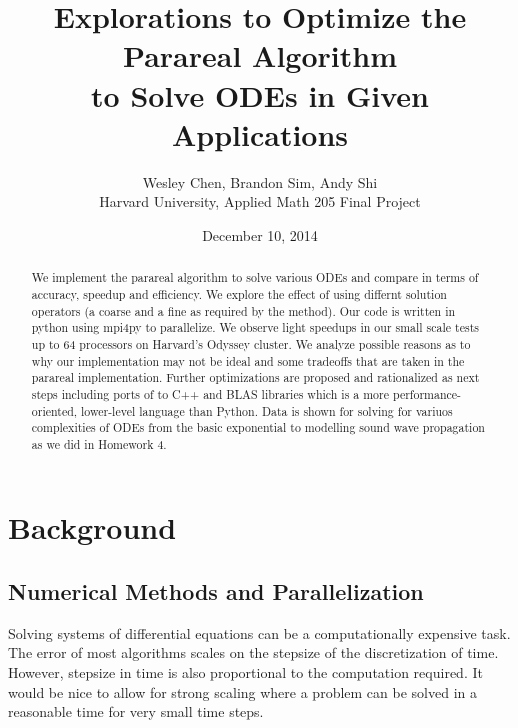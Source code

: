 \documentclass[letterpaper,12pt]{article}
\begin{document}
\title{Explorations to Optimize the Parareal Algorithm \\to Solve ODEs in Given Applications}
\author{Wesley Chen, Brandon Sim, Andy Shi \\
Harvard University, Applied Math 205 Final Project}
\date{December 10, 2014}

\setlength\parindent{0pt}

\setlength\parskip{2ex}

\maketitle
\begin{abstract}
We implement the parareal algorithm to solve various ODEs and compare in
terms of accuracy, speedup and efficiency. We explore the effect of using
differnt solution operators (a coarse and a fine as required by the method).
Our code is written in python using mpi4py to parallelize. We observe
light speedups in our small scale tests up to 64 processors on Harvard's
Odyssey cluster. We analyze possible reasons as to why our implementation
may not be ideal and some tradeoffs that are taken in the parareal
implementation. Further optimizations are proposed and rationalized as next
steps including ports of to C++ and BLAS libraries which is a more
performance-oriented, lower-level language than Python. Data is shown for
solving for variuos complexities of ODEs from the basic exponential to
modelling sound wave propagation as we did in Homework 4.
\end{abstract}

\clearpage

\tableofcontents

\clearpage

\section{Background}

\subsection{Numerical Methods and Parallelization}
Solving systems of differential equations can be a computationally expensive
task. The error of most algorithms scales on the stepsize of the discretization
of time. However, stepsize in time is also proportional to the computation
required. It would be nice to allow for strong scaling where a problem can be
solved in a reasonable time for very small time steps.
\end{document}
